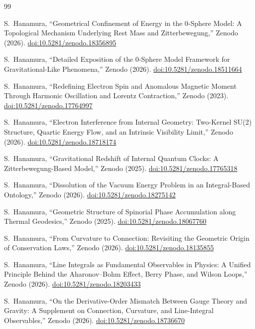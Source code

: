 \documentclass[%
 reprint,
 amsmath,amssymb,
 aps,
 prb,
]{revtex4-2}
\numberwithin{equation}{section}
\begin{document}
\begin{thebibliography}{99}

S.~Hanamura, ``Geometrical Confinement of Energy in the 0-Sphere Model: A Topological Mechanism Underlying Rest Mass and Zitterbewegung,'' Zenodo (2026). \href{https://doi.org/10.5281/zenodo.18356895}{doi:10.5281/zenodo.18356895}

S.~Hanamura, ``Detailed Exposition of the 0-Sphere Model Framework for Gravitational-Like Phenomena,'' Zenodo (2026). \href{https://doi.org/10.5281/zenodo.18511664}{doi:10.5281/zenodo.18511664}

S.~Hanamura, ``Redefining Electron Spin and Anomalous Magnetic Moment Through Harmonic Oscillation and Lorentz Contraction,'' Zenodo (2023). \href{https://doi.org/10.5281/zenodo.17764997}{doi:10.5281/zenodo.17764997}

S.~Hanamura, ``Electron Interference from Internal Geometry: Two-Kernel SU(2) Structure, Quartic Energy Flow, and an Intrinsic Visibility Limit,'' Zenodo (2026). \href{https://doi.org/10.5281/zenodo.18718174}{doi:10.5281/zenodo.18718174}

S.~Hanamura, ``Gravitational Redshift of Internal Quantum Clocks: A Zitterbewegung-Based Model,'' Zenodo (2025). \href{https://doi.org/10.5281/zenodo.17765318}{doi:10.5281/zenodo.17765318}

S.~Hanamura, ``Dissolution of the Vacuum Energy Problem in an Integral-Based Ontology,'' Zenodo (2026). \href{https://doi.org/10.5281/zenodo.18275142}{doi:10.5281/zenodo.18275142}

S.~Hanamura, ``Geometric Structure of Spinorial Phase Accumulation along Thermal Geodesics,'' Zenodo (2025). \href{https://doi.org/10.5281/zenodo.18067760}{doi:10.5281/zenodo.18067760}

S.~Hanamura, ``From Curvature to Connection: Revisiting the Geometric Origin of Conservation Laws,'' Zenodo (2026). \href{https://doi.org/10.5281/zenodo.18135855}{doi:10.5281/zenodo.18135855}

S.~Hanamura, ``Line Integrals as Fundamental Observables in Physics: A Unified Principle Behind the Aharonov--Bohm Effect, Berry Phase, and Wilson Loops,'' Zenodo (2026). \href{https://doi.org/10.5281/zenodo.18203433}{doi:10.5281/zenodo.18203433}

S.~Hanamura, ``On the Derivative-Order Mismatch Between Gauge Theory and Gravity: A Supplement on Connection, Curvature, and Line-Integral Observables,'' Zenodo (2026). \href{https://doi.org/10.5281/zenodo.18736670}{doi:10.5281/zenodo.18736670}


\end{thebibliography}
\end{document}
